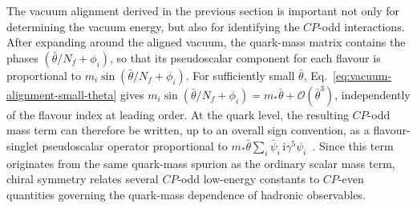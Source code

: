 \documentclass[review]{elsarticle}
\numberwithin{equation}{section}
\numberwithin{table}{section}
\numberwithin{figure}{section}
\def\i{\mathrm{i}}
\begin{document}
The vacuum alignment derived in the previous section is important not only for determining the vacuum energy, but also for identifying the $CP$-odd interactions. After expanding around the aligned vacuum, the quark-mass matrix contains the phases $(\bar\theta/N_f+\phi_i)$, so that its pseudoscalar component for each flavour is proportional to $m_i\sin(\bar\theta/N_f+\phi_i)$. For sufficiently small $\bar\theta$, Eq.~\eqref{eq:vacuum-alignment-small-theta} gives
$m_i\sin(\bar\theta/N_f+\phi_i)=m_*\bar\theta+\mathcal{O}(\bar\theta^3)$,
independently of the flavour index at leading order. At the quark level, the resulting $CP$-odd mass term can therefore be written, up to an overall sign convention, as a flavour-singlet pseudoscalar operator proportional to
$m_*\bar\theta\sum_i\bar\psi_i\,\i\gamma^5\psi_i$~\cite{Baluni:1978rf,Crewther:1979pi,Mereghetti:2010tp}. Since this term originates from the same quark-mass spurion as the ordinary scalar mass term, chiral symmetry relates several $CP$-odd low-energy constants to $CP$-even quantities governing the quark-mass dependence of hadronic observables.
\end{document}
